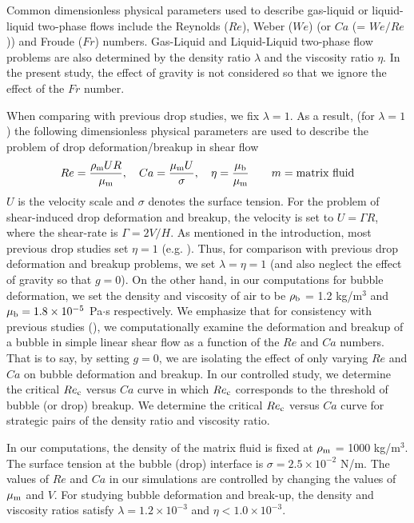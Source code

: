 \documentclass[review]{elsarticle}
\begin{document}
Common dimensionless physical parameters used to describe gas-liquid or
liquid-liquid two-phase flows include the Reynolds ($Re$), Weber ($We$) (or
$Ca$ (= $We/Re$)) and Froude ($Fr$) numbers.  Gas-Liquid and Liquid-Liquid
two-phase flow problems are also determined by the density ratio $\lambda$ and
the viscosity ratio $\eta$.  In the present study, the effect of gravity is not
considered so that we ignore the effect of the $Fr$ number.

When comparing with previous drop studies, we fix $\lambda=1$.  As a result,
(for $\lambda=1$) the following dimensionless physical parameters are used to
describe the problem of drop deformation/breakup in shear flow
%
\begin{eqnarray}\label{dimensonless}
  Re = \frac{\rho_{\rm m}UR}{\mu_{\rm m}}, \quad
  Ca = \frac{\mu_{\rm m}U}{\sigma}, \quad
  \eta = \frac{\mu_{\rm b}}{\mu_{\rm m}} 
	\hspace{20pt} m=\mbox{matrix fluid}
\end{eqnarray}
%
$U$ is the velocity scale and $\sigma$ denotes the surface tension.  For the
problem of shear-induced drop deformation and breakup, the velocity is set to
$U = \mathit{\Gamma} R$, where the shear-rate is $\mathit{\Gamma} = 2V/H$.  As
mentioned in the introduction, most previous drop studies set $\eta = 1$ (e.g.
\cite{LiRenRen00}).  Thus, for comparison with previous drop deformation and
breakup problems, we set $\lambda = \eta = 1$ (and also neglect the effect of
gravity so that $g=0$). On the other hand, in our computations for bubble
deformation, we set the density and viscosity of air to be $\rho_{\rm b}$ = 1.2
kg/m$^{3}$ and $\mu_{\rm b} = 1.8 \times 10^{-5}$ Pa$\cdot$s respectively.  We
emphasize that for consistency with previous studies (\cite{LiRenRen00,
RusMan02, MulTobDreFisWin08, KomShaEskDer14, AmaBalCasOli19}), we
computationally examine the deformation and breakup of a bubble in simple
linear shear flow as a function of the $Re$ and $Ca$ numbers.  That is to say,
by setting $g=0$, we are isolating the effect of only varying $Re$ and $Ca$ on
bubble deformation and breakup.  In our controlled study, we determine the
critical $Re_{\rm c}$ versus $Ca$ curve in which $Re_{\rm c}$ corresponds to
the threshold of bubble (or drop) breakup.  We determine the critical $Re_{\rm
c}$ versus $Ca$ curve for strategic pairs of the density ratio and viscosity
ratio.

In our computations, the density of the matrix fluid is fixed at $\rho_{\rm m}$
= 1000 kg/m$^3$.  The surface tension at the bubble (drop) interface is $\sigma
=2.5 \times 10^{-2}$ N/m.  The values of $Re$ and $Ca$ in our simulations are
controlled by changing the values of $\mu_{\rm m}$ and $V$.  For studying
bubble deformation and break-up, the density and viscosity ratios satisfy
$\lambda = 1.2 \times 10^{-3}$ and $\eta < 1.0 \times 10^{-3}$.
\end{document}
